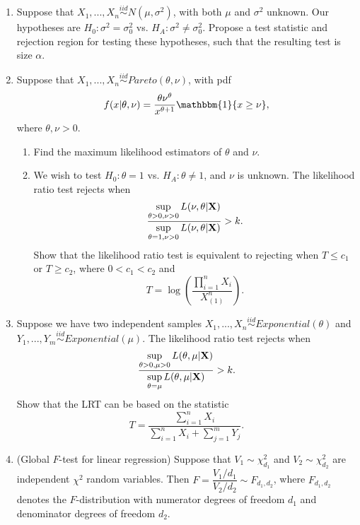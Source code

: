 \documentclass[11pt]{article}
\begin{document}
\begin{enumerate}
\item Suppose that $X_1,...,X_n \overset{iid}{\sim} N(\mu, \sigma^2)$, with both $\mu$ and $\sigma^2$ unknown. Our hypotheses are $H_0: \sigma^2 = \sigma_0^2$ vs. $H_A: \sigma^2 \neq \sigma_0^2$. Propose a test statistic and rejection region for testing these hypotheses, such that the resulting test is size $\alpha$.

\item Suppose that $X_1,...,X_n \overset{iid}{\sim} Pareto(\theta, \nu)$, with pdf
$$f(x |\theta, \nu) = \dfrac{\theta \nu^{\theta}}{x^{\theta + 1}} \mathbbm{1}\{x \geq \nu\},$$
where $\theta, \nu > 0$. 

\begin{enumerate}
\item Find the maximum likelihood estimators of $\theta$ and $\nu$.

\item We wish to test $H_0: \theta = 1$ vs. $H_A: \theta \neq 1$, and $\nu$ is unknown. The likelihood ratio test rejects when
$$\dfrac{\sup \limits_{\theta > 0, \nu > 0} L(\nu, \theta | {\bf X})}{\sup \limits_{\theta = 1, \nu > 0} L(\nu, \theta | {\bf X})} > k.$$
Show that the likelihood ratio test is equivalent to rejecting when $T \leq c_1$ or $T \geq c_2$, where $0 < c_1 < c_2$ and
$$T = \log \left( \frac{\prod \limits_{i=1}^n X_i}{X_{(1)}^n} \right).$$
\end{enumerate}

\item Suppose we have two independent samples $X_1,...,X_n \overset{iid}{\sim} Exponential(\theta)$ and $Y_1,...,Y_m \overset{iid}{\sim} Exponential(\mu)$. The likelihood ratio test rejects when 
$$\frac{\sup \limits_{\theta > 0, \mu > 0} L(\theta, \mu | {\bf X})}{\sup \limits_{\theta = \mu} L(\theta, \mu | {\bf X})} > k.$$
Show that the LRT can be based on the statistic
$$T = \frac{\sum \limits_{i=1}^n X_i}{\sum \limits_{i=1}^n X_i + \sum \limits_{j=1}^m Y_j}.$$

\item (Global $F$-test for linear regression) Suppose that $V_1 \sim \chi^2_{d_1}$ and $V_2 \sim \chi^2_{d_2}$ are independent $\chi^2$ random variables. Then $F = \dfrac{V_1/d_1}{V_2/d_2} \sim F_{d_1, d_2}$, where $F_{d_1, d_2}$ denotes the $F$-distribution with numerator degrees of freedom $d_1$ and denominator degrees of freedom $d_2$.\\


\end{enumerate}
\end{document}

